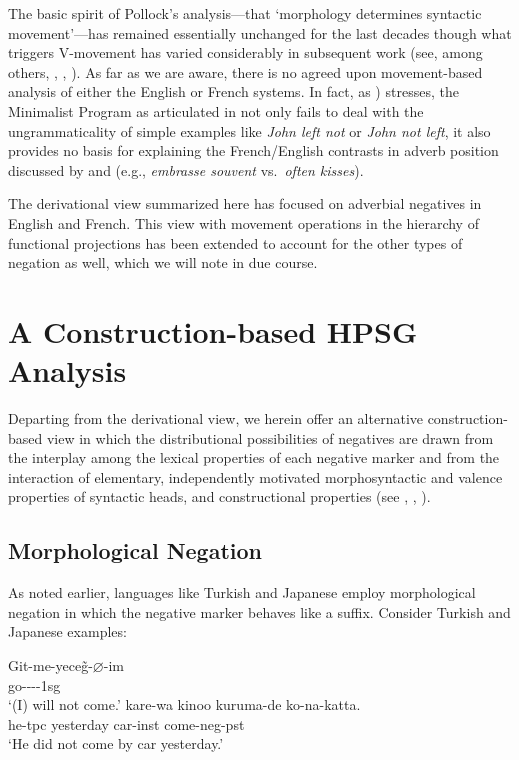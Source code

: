 \documentclass[output=paper]{langsci/langscibook}
\begin{document}
{The basic spirit of Pollock's analysis---that `morphology determines syntactic movement'---has
remained essentially unchanged for the last decades though what triggers V-movement has varied
considerably in subsequent work (see, among others, \citet{Zanuttini:01}, \citet{Bo:14},
\citet{Zeijlstra:15}).  As far as we are aware, there is no agreed upon movement-based analysis of
either the English or French systems. In fact, as \citet{Lasnik:00}) stresses, the Minimalist
Program as articulated in \citet{Chomsky:93,Chomsky:95,Chomsky:00-mini-inq} not only fails to deal with the
ungrammaticality of simple examples like {\it *John left not} or {\it *John not left}, it also
provides no basis for explaining the French/English contrasts in adverb position discussed by
\citet{Pollock:89} and \citet{Cinque:99} (e.g., {\it embrasse souvent} vs.\ {\it often
  kisses}).


The derivational view summarized here has focused on adverbial negatives
in English and French. This view with movement operations in the
 hierarchy of functional projections has been extended to account for the other types of negation as well, which we will note in due course.

\section{A Construction-based HPSG Analysis}

Departing from the derivational view, we
herein offer an alternative construction-based view in which the distributional possibilities of negatives
are drawn from the interplay among the lexical properties of each negative marker
and from the interaction of elementary, independently motivated
morphosyntactic and valence properties of syntactic heads, and constructional
properties (see \citet{Kim:00}, \citet{KS:02}, \citet{Crowgey:12}).


\subsection{Morphological Negation}

As noted earlier, languages like Turkish and Japanese employ morphological negation in which the negative marker behaves like a suffix. Consider
Turkish and Japanese examples:



\eal
\ex
\gll Git-me-yece\~{g}-$\varnothing$-im \\
    go-\NEG-\FUT-\COP-{\sc 1sg} \\
\glt `(I) will not come.'
\ex
\gll kare-wa kinoo kuruma-de ko-na-katta. \\
     he-{\sc tpc} yesterday car-{\sc inst} come-{\sc neg}-{\sc pst} \\
\glt `He did not come by car yesterday.'
\zl




}
\end{document}
